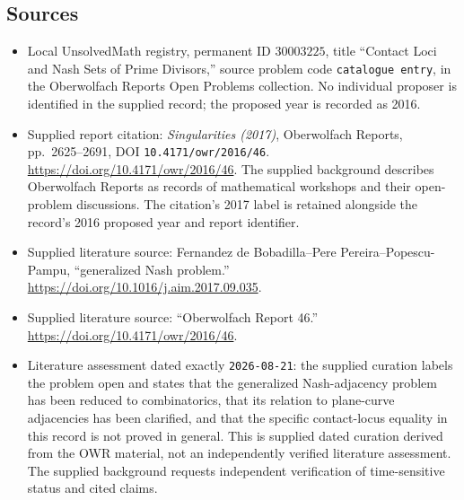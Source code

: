 \documentclass[11pt]{article}
\begin{document}
\subsection{Sources}
\begin{itemize}
\item Local UnsolvedMath registry, permanent ID \(30003225\), title ``Contact Loci and Nash Sets of Prime Divisors,'' source problem code \texttt{catalogue entry}, in the Oberwolfach Reports Open Problems collection. No individual proposer is identified in the supplied record; the proposed year is recorded as 2016.
\item Supplied report citation: \emph{Singularities (2017)}, Oberwolfach Reports, pp.\ 2625--2691, DOI \texttt{10.4171/owr/2016/46}. \url{https://doi.org/10.4171/owr/2016/46}. The supplied background describes Oberwolfach Reports as records of mathematical workshops and their open-problem discussions. The citation's 2017 label is retained alongside the record's 2016 proposed year and report identifier.
\item Supplied literature source: Fernandez de Bobadilla--Pere Pereira--Popescu-Pampu, ``generalized Nash problem.'' \url{https://doi.org/10.1016/j.aim.2017.09.035}.
\item Supplied literature source: ``Oberwolfach Report 46.'' \url{https://doi.org/10.4171/owr/2016/46}.
\item Literature assessment dated exactly \texttt{2026-08-21}: the supplied curation labels the problem open and states that the generalized Nash-adjacency problem has been reduced to combinatorics, that its relation to plane-curve adjacencies has been clarified, and that the specific contact-locus equality in this record is not proved in general. This is supplied dated curation derived from the OWR material, not an independently verified literature assessment. The supplied background requests independent verification of time-sensitive status and cited claims.
\end{itemize}
\end{document}
